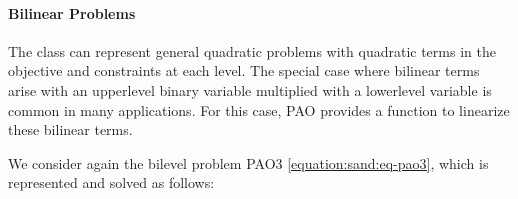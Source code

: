 \documentclass[letterpaper,10pt,english]{sphinxmanual}
\begin{document}
\begin{sphinxVerbatim}[commandchars=\\\{\}]
  
\PYG{p}{[}\PYG{p}{]}  \PYG{p}{[}\PYG{p}{]}
  
\PYG{p}{[}\PYG{p}{]}  \PYG{p}{[}\PYG{p}{[}\PYG{p}{]} \PYG{p}{[} \PYG{p}{]} \PYG{p}{[}\PYG{p}{]} \PYG{p}{[}\PYG{p}{]}\PYG{p}{]}
\PYG{p}{[}\PYG{p}{]}  \PYG{p}{[}\PYG{p}{[}\PYG{p}{]} \PYG{p}{[} \PYG{p}{]} \PYG{p}{[}\PYG{p}{]} \PYG{p}{[} \PYG{p}{]}\PYG{p}{]}
\PYG{p}{[}\PYG{p}{]}  \PYG{p}{[}\PYG{p}{[}\PYG{p}{]} \PYG{p}{[}\PYG{p}{]} \PYG{p}{[}\PYG{p}{]} \PYG{p}{[} \PYG{p}{]}\PYG{p}{]}
  \PYG{p}{[}\PYG{p}{]}
\end{sphinxVerbatim}


\paragraph{Bilinear Problems}
\label{\detokenize{representations/mpr:bilinear-problems}}
The {\hyperref[\detokenize{reference/mpr:pao.mpr.repn.QuadraticMultilevelProblem}]{}} class can represent general
quadratic problems with quadratic terms in the objective and constraints
at each level.  The special case where bilinear terms arise with an
upper\sphinxhyphen{}level binary variable multiplied with a lower\sphinxhyphen{}level variable is
common in many applications.  For this case, PAO provides a function to
linearize these bilinear terms.

We consider again the bilevel problem PAO3 \eqref{equation:sand:eq-pao3}, which is
represented and solved as follows:
\end{document}
